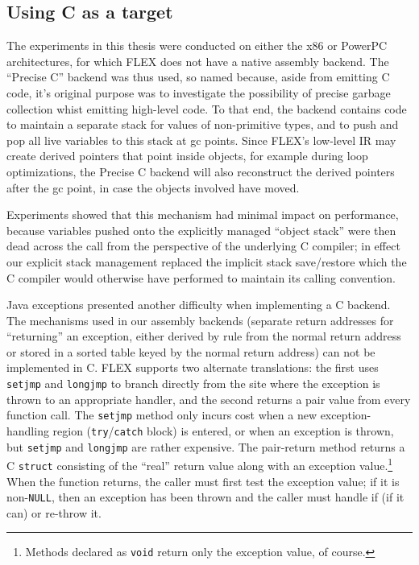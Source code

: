 \subsection*{Using C as a target}\label{sec:precisec}
The experiments in this thesis were conducted on either the x86 or
PowerPC architectures, for which FLEX does not have a native assembly
backend.  The ``Precise C'' backend was thus used, so named because,
aside from emitting C code, it's original purpose was to investigate
the possibility of precise garbage collection whist emitting
high-level code.  To that end, the backend contains code to maintain a
separate stack for values of non-primitive types, and to push and pop
all live variables to this stack at gc points.  Since FLEX's low-level
IR may create derived pointers that point inside objects, for example
during loop optimizations, the Precise C backend will also reconstruct
the derived pointers after the gc point, in case the objects involved
have moved.\label{sec:precise-gc}

Experiments showed that this mechanism had minimal impact on
performance, because variables pushed onto the explicitly managed
``object stack'' were then dead across the call from the perspective
of the underlying C compiler; in effect our explicit stack management
replaced the implicit stack save/restore which the C compiler would
otherwise have performed to maintain its calling convention.

Java exceptions presented another difficulty when implementing a C
backend.  The mechanisms used in our assembly backends (separate
return addresses for ``returning'' an exception, either derived by
rule from the normal return address or stored in a sorted table keyed
by the normal return address) can not be implemented in C.  FLEX supports
two alternate translations: the first uses \texttt{setjmp} and
\texttt{longjmp} to branch directly from the site where the exception
is thrown to an appropriate handler, and the second returns a pair
value from every function call.  The \texttt{setjmp} method only
incurs cost when a new exception-handling region
(\texttt{try}/\texttt{catch} block) is entered, or when an exception
is thrown, but \texttt{setjmp} and \texttt{longjmp} are rather
expensive.  The pair-return method returns a C \texttt{struct}
consisting of the ``real'' return value along with an exception
value.\footnote{Methods declared as \texttt{void} return only the
  exception value, of course.}  When the function returns, the caller
must first test the exception value; if it is non-\texttt{NULL}, then
an exception has been thrown and the caller must handle if (if it can)
or re-throw it.

